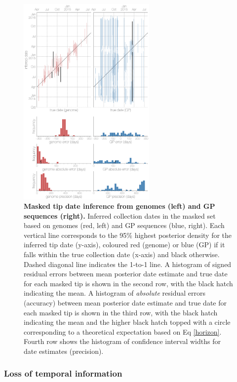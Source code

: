 \documentclass[11pt,oneside,letterpaper]{article}
\begin{document}
\begin{figure}[h]
 \centering
	\includegraphics[width=0.6\textwidth]{figures/fig2_dates.png}
	\caption{\textbf{Masked tip date inference from genomes (left) and GP sequences (right).}
  Inferred collection dates in the masked set based on genomes (red, left) and GP sequences (blue, right).
  Each vertical line corresponds to the 95\% highest posterior density for the inferred tip date (y-axis), coloured red (genome) or blue (GP) if it falls within the true collection date (x-axis) and black otherwise.
  Dashed diagonal line indicates the 1-to-1 line.
  A histogram of signed residual errors between mean posterior date estimate and true date for each masked tip is shown in the second row, with the black hatch indicating the mean.
  A histogram of \textit{absolute} residual errors (accuracy) between mean posterior date estimate and true date for each masked tip is shown in the third row, with the black hatch indicating the mean and the higher black hatch topped with a circle corresponding to a theoretical expectation based on Eq \ref{horizon}.
  Fourth row shows the histogram of confidence interval widths for date estimates (precision).
	}
	\label{dates}
\end{figure}

\subsubsection*{Loss of temporal information}
\end{document}
